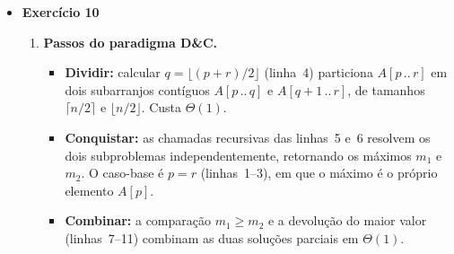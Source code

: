 \documentclass[9pt,a4paper]{extarticle}
\begin{document}
\begin{itemize}
\begin{enumerate}[label=(\alph*)]
    \item \textbf{\textcolor{laranja}{Melhor caso.}} Ocorre quando $A[1] = A[2]$: na primeira iteração do laço externo, com $i = 1$ e $j = 2$, a linha~3 executa uma única vez, o teste é verdadeiro e o algoritmo retorna na linha~4.

    Número de execuções da linha~3: exatamente $1$. Cada uma das demais linhas executa $O(1)$ vezes. Portanto
    \[
        T_{\text{melhor}}(n) = \Theta(1).
    \]

    \item \textbf{Comparação com \textsc{Insertion-Sort}.} Tanto \textsc{Tem-Duplicata} quanto \textsc{Insertion-Sort} apresentam $T_{\text{pior}}(n) = \Theta(n^2)$. A semelhança é estrutural: ambos os algoritmos varrem todos (ou quase todos) os pares de índices $(i, j)$ com $i < j$, o que naturalmente leva à soma $\sum_{i=1}^{n-1}(n-i) = \frac{n(n-1)}{2}$. A diferença está no melhor caso: \textsc{Insertion-Sort} sobre um arranjo já ordenado executa apenas a comparação inicial de cada iteração externa, atingindo $\Theta(n)$; \textsc{Tem-Duplicata}, por sua vez, sai imediatamente quando o primeiro par $(1, 2)$ já é igual, atingindo $\Theta(1)$.
\end{enumerate}

\item \textbf{Exercício 10}


\begin{enumerate}[label=(\alph*)]
    \item \textbf{Passos do paradigma D\&C.}
    \begin{itemize}
        \item \textbf{Dividir:} calcular $q = \lfloor (p + r)/2 \rfloor$ (linha~4) particiona $A[p\,..\,r]$ em dois subarranjos contíguos $A[p\,..\,q]$ e $A[q+1\,..\,r]$, de tamanhos $\lceil n/2 \rceil$ e $\lfloor n/2 \rfloor$. Custa $\Theta(1)$.
        \item \textbf{Conquistar:} as chamadas recursivas das linhas~5 e~6 resolvem os dois subproblemas independentemente, retornando os máximos $m_1$ e $m_2$. O caso-base é $p = r$ (linhas~1--3), em que o máximo é o próprio elemento $A[p]$.
        \item \textbf{Combinar:} a comparação $m_1 \geq m_2$ e a devolução do maior valor (linhas~7--11) combinam as duas soluções parciais em $\Theta(1)$.
    \end{itemize}


\end{enumerate}
\end{itemize}
\end{document}
